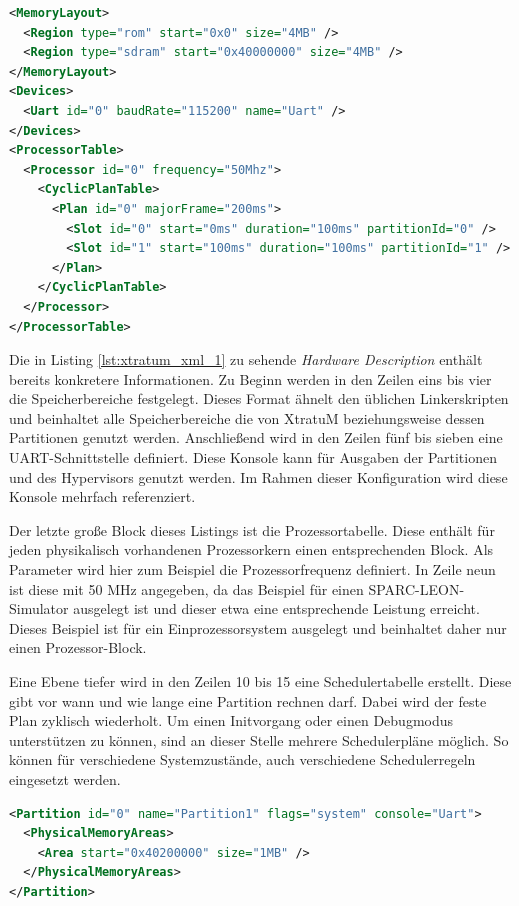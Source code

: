 \documentclass[
  a4paper,					    %
  twoside,
  DIV=calc,     				%
  bibliography=totoc,
  cleardoublepage=empty,
  ngerman,     					%
  final       					%
]{scrbook}
\begin{document}
\begin{lstlisting}[frame=single, language=XML, basicstyle=\footnotesize, caption={XtratuM Hardware Description}, label={lst:xtratum_xml_1}]
<MemoryLayout>
  <Region type="rom" start="0x0" size="4MB" />
  <Region type="sdram" start="0x40000000" size="4MB" />
</MemoryLayout>
<Devices>
  <Uart id="0" baudRate="115200" name="Uart" />
</Devices>
<ProcessorTable>
  <Processor id="0" frequency="50Mhz">
    <CyclicPlanTable>
      <Plan id="0" majorFrame="200ms">
        <Slot id="0" start="0ms" duration="100ms" partitionId="0" />
        <Slot id="1" start="100ms" duration="100ms" partitionId="1" />
      </Plan>
    </CyclicPlanTable>
  </Processor>
</ProcessorTable>
\end{lstlisting}

Die in Listing \ref{lst:xtratum_xml_1} zu sehende \emph{Hardware Description} enthält bereits konkretere Informationen. Zu Beginn werden in den Zeilen eins bis vier die Speicherbereiche festgelegt. Dieses Format ähnelt den üblichen Linkerskripten und beinhaltet alle Speicherbereiche die von XtratuM beziehungsweise dessen Partitionen genutzt werden. Anschließend wird in den Zeilen fünf bis sieben eine UART-Schnittstelle definiert. Diese Konsole kann für Ausgaben der Partitionen und des Hypervisors genutzt werden. Im Rahmen dieser Konfiguration wird diese Konsole mehrfach referenziert.

Der letzte große Block dieses Listings ist die Prozessortabelle. Diese enthält für jeden physikalisch vorhandenen Prozessorkern einen entsprechenden Block. Als Parameter wird hier zum Beispiel die Prozessorfrequenz definiert. In Zeile neun ist diese mit 50 MHz angegeben, da das Beispiel für einen SPARC-LEON-Simulator ausgelegt ist und dieser etwa eine entsprechende Leistung erreicht. Dieses Beispiel ist für ein Einprozessorsystem ausgelegt und beinhaltet daher nur einen Prozessor-Block.

Eine Ebene tiefer wird in den Zeilen 10 bis 15 eine Schedulertabelle erstellt. Diese gibt vor wann und wie lange eine Partition rechnen darf. Dabei wird der feste Plan zyklisch wiederholt. Um einen Initvorgang oder einen Debugmodus unterstützen zu können, sind an dieser Stelle mehrere Schedulerpläne möglich. So können für verschiedene Systemzustände, auch verschiedene Schedulerregeln eingesetzt werden.

\begin{lstlisting}[frame=single, language=XML, basicstyle=\footnotesize, caption={XtratuM Partition Table}, label={lst:xtratum_xml_2}]
<Partition id="0" name="Partition1" flags="system" console="Uart">
  <PhysicalMemoryAreas>
    <Area start="0x40200000" size="1MB" />
  </PhysicalMemoryAreas>
</Partition>
\end{lstlisting}
\end{document}
